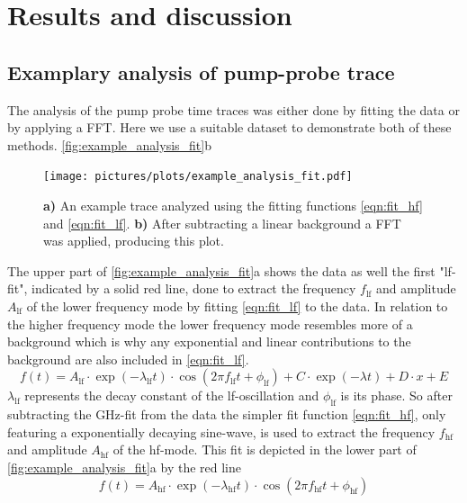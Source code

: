 \chapter{Results and discussion}
\section{Examplary analysis of pump-probe trace}
The analysis of the pump probe time traces was either done by fitting the data or by applying a FFT.
Here we use a suitable dataset to demonstrate both of these methods.
\autoref{fig:example_analysis_fit}b
\begin{figure}[ht]
    \centering
    \texttt{[image: pictures/plots/example\_analysis\_fit.pdf]}
    \caption{\textbf{a)} An example trace analyzed using the fitting functions \autoref{eqn:fit_hf} and \autoref{eqn:fit_lf}. \textbf{b)} After subtracting a linear background a FFT was applied, producing this plot.}
    \label{fig:example_analysis_fit}
\end{figure}
\FloatBarrier
The upper part of \autoref{fig:example_analysis_fit}a shows the data as well the first "lf-fit", indicated by a solid red line, done to extract the frequency $f_{\text{lf}}$ and amplitude $A_{\text{lf}}$ of the lower frequency mode by fitting \autoref{eqn:fit_lf} to the data.
In relation to the higher frequency mode the lower frequency mode resembles more of a background which is why any exponential and linear contributions to the background are also included in \autoref{eqn:fit_lf}.
\begin{equation}
    f(t) = A_{\text{lf}} \cdot \exp(-\lambda_{\text{lf}} t) \cdot \cos(2 \pi f_{\text{lf}} t + \phi_{\text{lf}}) + C \cdot \exp(-\lambda t) + D \cdot x + E
    \label{eqn:fit_lf}
\end{equation}
$\lambda_{\text{lf}}$ represents the decay constant of the lf-oscillation and $\phi_{\text{lf}}$ is its phase.
So after subtracting the GHz-fit from the data the simpler fit function \autoref{eqn:fit_hf}, only featuring a exponentially decaying sine-wave, is used to extract the frequency $f_{\text{hf}}$ and amplitude $A_{\text{hf}}$ of the hf-mode.
This fit is depicted in the lower part of \autoref{fig:example_analysis_fit}a by the red line
\begin{equation}
    f(t) = A_{\text{hf}} \cdot \exp(-\lambda_{\text{hf}} t) \cdot \cos(2 \pi f_{\text{hf}} t + \phi_{\text{hf}})
    \label{eqn:fit_hf}
\end{equation}
